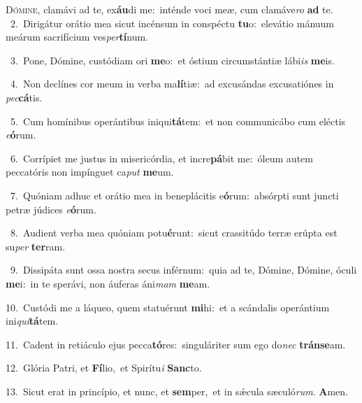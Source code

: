 \lettrine{\initial\textcolor{\initialcolor}{D}}{ómine,} clamávi ad te, ex\-\textbf{áu}\-di me:~\star inténde voci meæ, cum clamáve\textit{ro} \textbf{ad} te.\\
{\numbfont\textcolor{\numbcolor}{~2.}}~Dirigátur orátio mea sicut incénsum in conspéctu \textbf{tu}\-o:~\star elevátio mánuum meárum sacrifícium ves\-\textit{per}\-\textbf{tí}num.\par
{\numbfont\textcolor{\numbcolor}{~3.}}~Pone, Dómine, custódiam ori \textbf{me}\-o:~\star et óstium circumstántiæ lábi\textit{is} \textbf{me}\-is.\par
{\numbfont\textcolor{\numbcolor}{~4.}}~Non declínes cor meum in verba ma\-\textbf{lí}\-tiæ:~\star ad excusándas excusatiónes in \textit{pec}\-\textbf{cá}tis.\par
{\numbfont\textcolor{\numbcolor}{~5.}}~Cum homínibus operántibus iniqui\-\textbf{tá}\-tem:~\star et non communicábo cum eléctis \textit{e}\-\textbf{ó}rum.\par
{\numbfont\textcolor{\numbcolor}{~6.}}~Corrípiet me justus in misericórdia, et incre\-\textbf{pá}\-bit me:~\star óleum autem peccatóris non impínguet ca\textit{put} \textbf{me}\-um.\par
{\numbfont\textcolor{\numbcolor}{~7.}}~Quóniam adhuc et orátio mea in beneplácitis e\-\textbf{ó}\-rum:~\star absórpti sunt juncti petræ júdices \textit{e}\-\textbf{ó}rum.\par
{\numbfont\textcolor{\numbcolor}{~8.}}~Audient verba mea quóniam potu\-\textbf{é}\-runt:~\star sicut crassitúdo terræ erúpta est su\textit{per} \textbf{ter}\-ram.\par
{\numbfont\textcolor{\numbcolor}{~9.}}~Dissipáta sunt ossa nostra secus inférnum:~\dagger quia ad te, Dómine, Dómine, óculi \textbf{me}\-i:~\star in te sperávi, non áuferas áni\textit{mam} \textbf{me}\-am.\par
{\numbfont\textcolor{\numbcolor}{10.}}~Custódi me a láqueo, quem statuérunt \textbf{mi}\-hi:~\star et a scándalis operántium ini\-\textit{qui}\-\textbf{tá}tem.\par
{\numbfont\textcolor{\numbcolor}{11.}}~Cadent in retiáculo ejus pecca\-\textbf{tó}\-res:~\star singuláriter sum ego do\textit{nec} \textbf{tráns}\-\textbf{e}am.\par
{\numbfont\textcolor{\numbcolor}{12.}}~Glória Patri, et \textbf{Fí}\-lio,~\star et Spirítu\textit{i} \textbf{Sanc}\-to.\par
{\numbfont\textcolor{\numbcolor}{13.}}~Sicut erat in princípio, et nunc, et \textbf{sem}\-per,~\star et in sǽcula sæculó\-\textit{rum}\-. \textbf{A}\-men.\par
